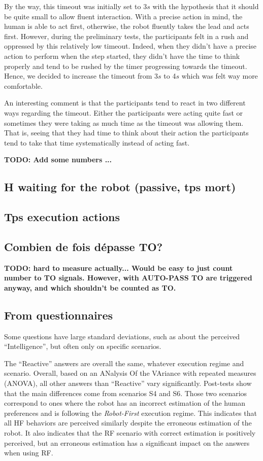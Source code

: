 By the way, this timeout was initially set to 3$s$ with the hypothesis that it should be quite small to allow fluent interaction. With a precise action in mind, the human is able to act first, otherwise, the robot fluently takes the lead and acts first. However, during the preliminary tests, the participants felt in a rush and oppressed by this relatively low timeout. Indeed, when they didn't have a precise action to perform when the step started, they didn't have the time to think properly and tend to be rushed by the timer progressing towards the timeout. Hence, we decided to increase the timeout from 3$s$ to 4$s$ which was felt way more comfortable. 

An interesting comment is that the participants tend to react in two different ways regarding the timeout. Either the participants were acting quite fast or sometimes they were taking as much time as the timeout was allowing them. That is, seeing that they had time to think about their action the participants tend to take that time systematically instead of acting fast. 

\textbf{TODO: Add some numbers ...}

\subsection*{H waiting for the robot (passive, tps mort)}

\subsection*{Tps execution actions}

\subsection*{Combien de fois dépasse TO?}
\textbf{TODO: hard to measure actually... Would be easy to just count number to TO signals. However, with AUTO-PASS TO are triggered anyway, and which shouldn't be counted as TO.}

\subsection{From questionnaires}

Some questions have large standard deviations, such as about the perceived ``Intelligence'', but often only on specific scenarios.

The ``Reactive'' answers are overall the same, whatever execution regime and scenario. 
Overall, based on an ANalysis Of the VAriance with repeated measures (ANOVA), all other answers than ``Reactive'' vary significantly. Post-tests show that the main differences come from scenarios S4 and S6. Those two scenarios correspond to ones where the robot has an incorrect estimation of the human preferences and is following the \textit{Robot-First} execution regime. This indicates that all HF behaviors are perceived similarly despite the erroneous estimation of the robot. It also indicates that the RF scenario with correct estimation is positively perceived, but an erroneous estimation has a significant impact on the answers when using RF.  

